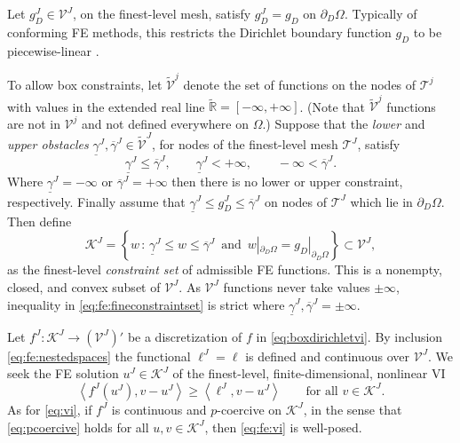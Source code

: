 \documentclass[letterpaper,final,12pt,reqno]{amsart}
\theoremstyle{cstyle}
\theoremstyle{cstyle*}
\theoremstyle{dstyle}
\numberwithin{equation}{section}
\numberwithin{figure}{section}
\numberwithin{table}{section}
\numberwithin{theorem}{section}
\newcommand{\RR}{\mathbb{R}}
\newcommand{\cK}{\mathcal{K}}
\newcommand{\ip}[2]{\left<#1,#2\right>}
\begin{document}
Let $g_D^J \in \mathcal{V}^J$, on the finest-level mesh, satisfy $g_D^J = g_D$ on $\partial_D \Omega$.  Typically of conforming FE methods, this restricts the Dirichlet boundary function $g_D$ to be piecewise-linear \cite{Elmanetal2014}.

To allow box constraints, let $\tilde{\mathcal{V}}^j$ denote the set of functions on the nodes of $\mathcal{T}^j$ with values in the extended real line $\tilde{\RR} = [-\infty,+\infty]$.  (Note that $\tilde{\mathcal{V}}^j$ functions are not in $\mathcal{V}^j$ and not defined everywhere on $\Omega$.)  Suppose that the \emph{lower} and \emph{upper obstacles} $\underline{\gamma}^J, \overline{\gamma}^J \in \tilde{\mathcal{V}}^J$, for nodes of the finest-level mesh $\mathcal{T}^J$, satisfy
\begin{equation}
\underline{\gamma}^J \le \overline{\gamma}^J, \qquad \underline{\gamma}^J < +\infty, \qquad -\infty < \overline{\gamma}^J. \label{eq:fe:boxconstraintrequirements}
\end{equation}
Where $\underline{\gamma}^J=-\infty$ or $\overline{\gamma}^J=+\infty$ then there is no lower or upper constraint, respectively.  Finally assume that $\underline{\gamma}^J \le g_D^J \le \overline{\gamma}^J$ on nodes of $\mathcal{T}^J$ which lie in $\partial_D \Omega$.  Then define
\begin{equation}
\mathcal{K}^J = \left\{w\,:\,\underline{\gamma}^J \le w \le \overline{\gamma}^J \, \text{ and } \, w|_{\partial_D\Omega} = g_D|_{\partial_D\Omega}\right\} \subset \mathcal{V}^J, \label{eq:fe:fineconstraintset}
\end{equation}
as the finest-level \emph{constraint set} of admissible FE functions.  This is a nonempty, closed, and convex subset of $\mathcal{V}^J$.  As $\mathcal{V}^J$ functions never take values $\pm\infty$, inequality in \eqref{eq:fe:fineconstraintset} is strict where $\underline{\gamma}^J, \overline{\gamma}^J = \pm \infty$.

Let $f^J:\mathcal{K}^J \to (\mathcal{V}^J)'$ be a discretization of $f$ in \eqref{eq:boxdirichletvi}.  By inclusion \eqref{eq:fe:nestedspaces} the functional $\ell^J=\ell$ is defined and continuous over $\mathcal{V}^J$.  We seek the FE solution $u^J \in \mathcal{K}^J$ of the finest-level, finite-dimensional, nonlinear VI
\begin{equation}
\ip{f^J(u^J)}{v-u^J} \ge \ip{\ell^J}{v-u^J} \qquad \text{for all } v\in \cK^J. \label{eq:fe:vi}
\end{equation}
As for \eqref{eq:vi}, if $f^J$ is continuous and $p$-coercive on $\mathcal{K}^J$, in the sense that \eqref{eq:pcoercive} holds for all $u,v \in \mathcal{K}^J$, then \eqref{eq:fe:vi} is well-posed.
\end{document}
